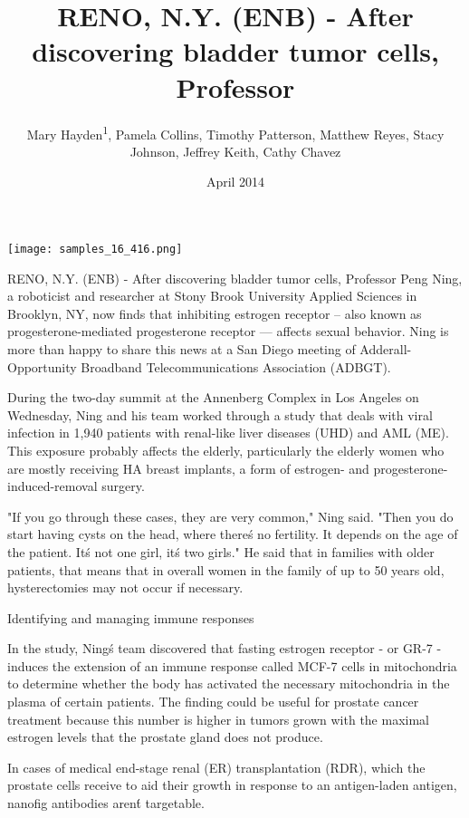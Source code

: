 \documentclass{article}
\title{RENO, N.Y. (ENB) - After discovering bladder tumor cells, Professor}
\author{Mary Hayden\textsuperscript{1},  Pamela Collins,  Timothy Patterson,  Matthew Reyes,  Stacy Johnson,  Jeffrey Keith,  Cathy Chavez}
\affil{\textsuperscript{1}Universiti Teknologi MARA}
\date{April 2014}
\begin{document}
\maketitle

\begin{center}
\begin{minipage}{0.75\linewidth}
\texttt{[image: samples\_16\_416.png]}
\end{minipage}
\end{center}

RENO, N.Y. (ENB) - After discovering bladder tumor cells, Professor Peng Ning, a roboticist and researcher at Stony Brook University Applied Sciences in Brooklyn, NY, now finds that inhibiting estrogen receptor – also known as progesterone-mediated progesterone receptor — affects sexual behavior. Ning is more than happy to share this news at a San Diego meeting of Adderall-Opportunity Broadband Telecommunications Association (ADBGT).

During the two-day summit at the Annenberg Complex in Los Angeles on Wednesday, Ning and his team worked through a study that deals with viral infection in 1,940 patients with renal-like liver diseases (UHD) and AML (ME). This exposure probably affects the elderly, particularly the elderly women who are mostly receiving HA breast implants, a form of estrogen- and progesterone-induced-removal surgery.

"If you go through these cases, they are very common," Ning said. "Then you do start having cysts on the head, where there\'s no fertility. It depends on the age of the patient. It\'s not one girl, it\'s two girls." He said that in families with older patients, that means that in overall women in the family of up to 50 years old, hysterectomies may not occur if necessary.

Identifying and managing immune responses

In the study, Ning\'s team discovered that fasting estrogen receptor - or GR-7 - induces the extension of an immune response called MCF-7 cells in mitochondria to determine whether the body has activated the necessary mitochondria in the plasma of certain patients. The finding could be useful for prostate cancer treatment because this number is higher in tumors grown with the maximal estrogen levels that the prostate gland does not produce.

In cases of medical end-stage renal (ER) transplantation (RDR), which the prostate cells receive to aid their growth in response to an antigen-laden antigen, nanofig antibodies aren\'t targetable.
\end{document}
